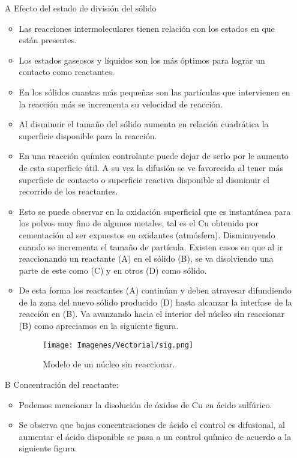 \begin{itemize}
 \item[A]  Efecto del estado de divisi\'on del s\'olido
 \begin{itemize}
  \item Las reacciones intermoleculares tienen relaci\'on con los estados en que est\'an presentes.
  \item 	Los estados gaseosos y líquidos son los más \'optimos para lograr un contacto como reactantes.
\item En los s\'olidos cuantas m\'as peque\~nas son las part\'iculas que intervienen en la reacci\'on m\'as se incrementa su velocidad de reacci\'on.
 \item Al disminuir el tama\~no del s\'olido aumenta en relaci\'on cuadr\'atica la superficie disponible para la reacci\'on.
\item En una reacci\'on qu\'imica controlante puede dejar de serlo por le aumento de esta superficie \'util. A su vez la difusi\'on se ve favorecida al tener m\'as superficie de contacto o superficie reactiva disponible al disminuir el recorrido de los reactantes.
\item Esto se puede observar  en la oxidaci\'on superficial que es instant\'anea para los polvos muy fino de algunos metales, tal es el Cu obtenido por cementaci\'on	al ser expuestos en	oxidantes (atm\'osfera). Disminuyendo cuando	 se incrementa el tama\~no de part\'icula.
Existen casos en que al ir reaccionando un reactante (A) en el s\'olido (B), se va disolviendo una parte de este como (C) y en otros (D) como s\'olido.
\item De esta forma los reactantes (A) contin\'uan y deben atravesar difundiendo de la zona del nuevo s\'olido producido (D) hasta alcanzar la interfase de la reacci\'on en (B). Va avanzando hacia el interior del n\'ucleo sin reaccionar (B) como apreciamos en la siguiente figura.
\begin{figure}[H]
 \centering
 \texttt{[image: Imagenes/Vectorial/sig.png]}
 \caption{Modelo de un n\'ucleo sin reaccionar.}
 \label{fig:s}
\end{figure}
 \end{itemize}
\item[B] Concentraci\'on del reactante:
\begin{itemize}
 \item 	Podemos mencionar la disoluci\'on de \'oxidos de Cu en \'acido sulf\'urico.
 \item Se observa que bajas concentraciones de \'acido el control es difusional, al aumentar el \'acido disponible se pasa a un control qu\'imico de acuerdo a la siguiente figura.

\end{itemize}
\end{itemize}

